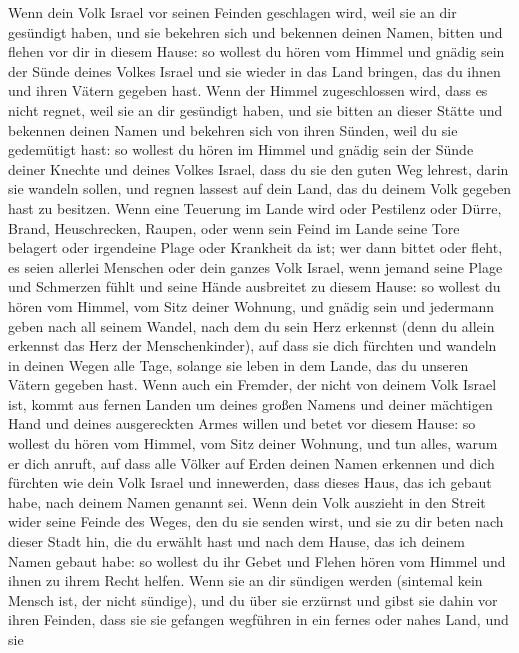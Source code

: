  Wenn dein Volk Israel vor seinen Feinden geschlagen wird,
weil sie an dir gesündigt haben, und sie bekehren sich und bekennen
deinen Namen, bitten und flehen vor dir in diesem Hause: 
so wollest du hören vom Himmel und gnädig sein der Sünde deines Volkes
Israel und sie wieder in das Land bringen, das du ihnen und ihren Vätern
gegeben hast.  Wenn der Himmel zugeschlossen wird, dass es
nicht regnet, weil sie an dir gesündigt haben, und sie bitten an dieser
Stätte und bekennen deinen Namen und bekehren sich von ihren Sünden,
weil du sie gedemütigt hast:  so wollest du hören im Himmel
und gnädig sein der Sünde deiner Knechte und deines Volkes Israel, dass
du sie den guten Weg lehrest, darin sie wandeln sollen, und regnen
lassest auf dein Land, das du deinem Volk gegeben hast zu besitzen.
 Wenn eine Teuerung im Lande wird oder Pestilenz oder
Dürre, Brand, Heuschrecken, Raupen, oder wenn sein Feind im Lande seine
Tore belagert oder irgendeine Plage oder Krankheit da ist; 
wer dann bittet oder fleht, es seien allerlei Menschen oder dein ganzes
Volk Israel, wenn jemand seine Plage und Schmerzen fühlt und seine Hände
ausbreitet zu diesem Hause:  so wollest du hören vom
Himmel, vom Sitz deiner Wohnung, und gnädig sein und jedermann geben
nach all seinem Wandel, nach dem du sein Herz erkennst (denn du allein
erkennst das Herz der Menschenkinder),  auf dass sie dich
fürchten und wandeln in deinen Wegen alle Tage, solange sie leben in dem
Lande, das du unseren Vätern gegeben hast.  Wenn auch ein
Fremder, der nicht von deinem Volk Israel ist, kommt aus fernen Landen
um deines großen Namens und deiner mächtigen Hand und deines
ausgereckten Armes willen und betet vor diesem Hause:  so
wollest du hören vom Himmel, vom Sitz deiner Wohnung, und tun alles,
warum er dich anruft, auf dass alle Völker auf Erden deinen Namen
erkennen und dich fürchten wie dein Volk Israel und innewerden, dass
dieses Haus, das ich gebaut habe, nach deinem Namen genannt sei.
 Wenn dein Volk auszieht in den Streit wider seine Feinde
des Weges, den du sie senden wirst, und sie zu dir beten nach dieser
Stadt hin, die du erwählt hast und nach dem Hause, das ich deinem Namen
gebaut habe:  so wollest du ihr Gebet und Flehen hören vom
Himmel und ihnen zu ihrem Recht helfen.  Wenn sie an dir
sündigen werden (sintemal kein Mensch ist, der nicht sündige), und du
über sie erzürnst und gibst sie dahin vor ihren Feinden, dass sie sie
gefangen wegführen in ein fernes oder nahes Land,  und sie
